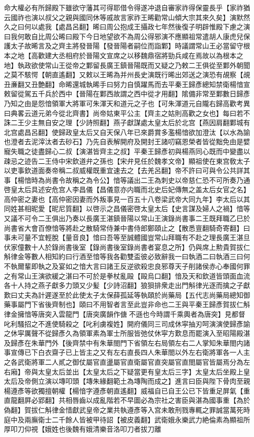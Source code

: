 命大權必有所歸殿下雖欲守藩其可得耶借令得遂冲退自審家祚得保靈長乎【家祚猶云國祚也演以叔父之親與國同休等戚故言家祚王晞勸常山傾大宗其來久矣】演默然久之曰何以處我【處昌呂翻】晞曰周公抱成王攝政七年然後復子明辟惟殿下慮之演曰我何敢自比周公晞曰殿下今日地望欲不為周公得邪演不應顯祖常遣胡人康虎兒保護太子故晞言及之齊主將發晉陽【發晉陽者嗣位而詣鄴】時議謂常山王必當留守根本之地【高歡建大丞相府於晉陽文宣席之以移魏鼎宿將勁兵咸在焉故以為根本之地】執政欲使常山王從帝之鄴留長廣王鎮晉陽既而又疑之乃敕二王俱從至鄴外朝聞之莫不駭愕【朝直遙翻】又敕以王晞為并州長史演既行晞出郊送之演恐有覘察【覘丑亷翻又丑艶翻】命晞還城執晞手曰努力自慎躍馬而去平秦王歸彥總知禁衛楊愔宣敕留從駕五千兵於西中【晉陽在鄴西故謂之西中從才用翻】隂備非常至鄴數日歸彥乃知之由是怨愔領軍大將軍可朱渾天和道元之子也【可朱渾道元自隴右歸高歡考異曰典畧云道元弟今從北齊書】尚帝姑東平公主【齊主之姑則高歡之女也】每曰若不誅二王少主無自安之理【少詩照翻】燕子獻謀處太皇太后於北宫【燕因肩翻鄴城有北宫處昌呂翻】使歸政皇太后又自天保八年已來爵賞多濫楊愔欲加澄汰【以水為諭也澄者去泥滓汰者去砂石】乃先自表解開府及開封王諸叨竊恩榮者皆從黜免由是嬖寵失職之徒盡歸心二叔【演湛皆齊主之叔】平秦王歸彥初與楊燕同心既而中變盡以疎忌之迹告二王侍中宋欽道弁之孫也【宋弁見任於魏孝文帝】顯祖使在東宫敎太子以吏事欽道面奏帝稱二叔威權既重宜速去之【去羌呂翻】帝不許曰可與令公共詳其事【楊愔時為尚書令故稱之為令公】愔等議出二王為刺史以帝慈仁恐不可所奏乃通啓皇太后具述安危宫人李昌儀【昌儀意亦内職而北史后妃傳無之盖太后女官之名】高仲密之妻也【高仲密因妻而外叛事見一百五十八卷梁武帝大同九年】李太后以其同姓甚相昵愛【昵尼質翻】以啓示之昌儀密啓太皇太后【史言謀及婦人之禍】愔等又議不可令二王俱出乃奏以長廣王湛鎮晉陽以常山王演錄尚書事二王既拜職乙巳於尚書省大會百僚愔等將赴之散騎常侍兼中書侍郎鄭頤止之【散悉亶翻騎奇寄翻】曰事未可量不宜輕脫【量音良】愔曰吾等至誠體國豈常山拜職有不赴之理長廣王湛旦伏家僮數十人於錄尚書後室【錄尚書後室錄尚書者宴息之所】仍與席上勲貴賀拔仁斛律金等數人相知約曰行酒至愔等我各勸雙盃彼必致辭我一曰執酒二曰執酒三曰何不執爾輩即執之及宴如之愔大言曰諸王反逆欲殺忠良邪尊天子削諸侯赤心奉國何罪之有常山王演欲緩之湛曰不可於是拳杖亂毆【毆烏口翻】愔及天和欽道皆頭面血流各十人持之燕子獻多力頭又少髪【少詩沼翻】狼狽排衆走出門斛律光逐而擒之子獻歎曰丈夫為計遲遂至於此使太子太保薛孤延等執頤於尚藥局【五代志尚藥局總知御藥事屬門下省後齊制也】頤曰不用智者言至此豈非命也二王與平秦王歸彥賀拔仁斛律金擁愔等唐突入雲龍門【唐突廣韻作傏不遜也今時謂千乘輿者為唐突】見都督叱利騷招之不進使騎殺之【叱利虜複姓】開府儀同三司成休寜抽刃呵演演使歸彥諭之休寜厲聲不從歸彥久為領軍素為軍士所服皆弛仗休寜方歎息而罷演入至昭陽殿湛及歸彥在朱華門外【後齊禁中有朱華閤門下省領左右局領左右二人掌知朱華閤内諸事宣傳已下白衣齋子已上皆主之又有左右直長四人朱華閤以外左右衛將軍各一人主之各武衛將軍二人貳之御仗屬官直盪屬官直衛屬官直突屬官直閤屬官皆屬焉分為左右廂】帝與太皇太后並出【太皇太后之下疑當更有皇太后三字】太皇太后坐殿上皇太后及帝側立演以塼叩頭【塼朱緣翻範土為塼陶而成之】進言曰臣與陛下骨肉至親楊遵彥等欲獨擅朝權【楊愔字遵彥朝直遙翻】威福自已自王公已下皆重足屏氣【重直龍翻屛必郢翻】共相唇齒以成亂階若不早圖必為宗社之害臣與湛為國事重【為於偽翻】賀拔仁斛律金惜獻武皇帝之業共執遵彥等入宫未敢刑戮專輒之罪誠當萬死時庭中及兩廡衛士二千餘人皆被甲待詔【被皮義翻】武衛娥永樂武力絶倫素為顯祖所厚叩刀仰視【娥姓也後魏有娥清樂音洛叩刀者拔刀離